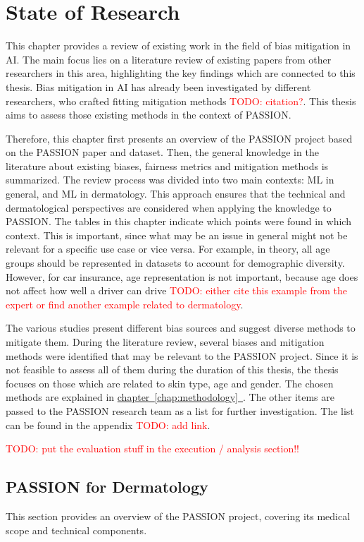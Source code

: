 \documentclass[12pt, a4paper, oneside]{book}   	%
\renewcommand{\todo}[1]{\textcolor{red}{TODO: #1}}
\newcommand{\linkchap}[1]{\hyperref[#1]{chapter~\ref{#1}~\nameref{#1}}}
\begin{document}
	\chapter{State of Research}
		This chapter provides a review of existing work in the field of bias mitigation in \gls{AI}. The main focus lies on a literature review of existing papers from other researchers in this area, highlighting the key findings which are connected to this thesis. Bias mitigation in \gls{AI} has already been investigated by different researchers, who crafted fitting mitigation methods \todo{citation?}. This thesis aims to assess those existing methods in the context of PASSION.
		
		Therefore, this chapter first presents an overview of the PASSION project based on the PASSION paper and dataset. Then, the general knowledge in the literature about existing biases, fairness metrics and mitigation methods is summarized. The review process was divided into two main contexts: \gls{ML} in general, and \gls{ML} in dermatology. This approach ensures that the technical and dermatological perspectives are considered when applying the knowledge to PASSION. The tables in this chapter indicate which points were found in which context. This is important, since what may be an issue in general might not be relevant for a specific use case or vice versa. For example, in theory, all age groups should be represented in datasets to account for demographic diversity. However, for car insurance, age representation is not important, because age does not affect how well a driver can drive \todo{either cite this example from the expert or find another example related to dermatology}.
		
		The various studies present different bias sources and suggest diverse methods to mitigate them. During the literature review, several biases and mitigation methods were identified that may be relevant to the PASSION project. Since it is not feasible to assess all of them during the duration of this thesis, the thesis focuses on those which are related to skin type, age and gender. The chosen methods are explained in \linkchap{chap:methodology}. The other items are passed to the PASSION research team as a list for further investigation. The list can be found in the appendix \todo{add link}.
		
		
		\todo{put the evaluation stuff in the execution / analysis section!!}
		
		
		\section{PASSION for Dermatology}
			This section provides an overview of the PASSION project, covering its medical scope and technical components.
			
\end{document}
